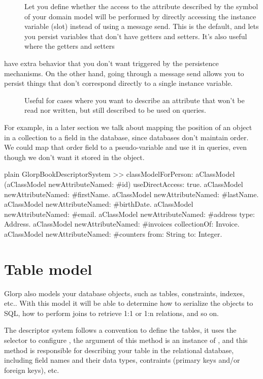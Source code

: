 \documentclass[10pt,twoside,english]{_support/latex/sbabook/sbabook}
\begin{document}
\begin{description}
\item[] Let you define whether the access to the attribute described by the symbol of your domain model will be performed by directly accessing the instance variable (slot) instead of using a message send. This is the default, and lets you persist variables that don't have getters and setters. It's also useful where the getters and setters
\end{description}

have extra behavior that you don't want triggered by the persistence mechanisms. On the other hand, going through a message send allows you to persist things that don't correspond directly to a single instance variable.

\begin{description}
\item[] Useful for cases where you want to describe an attribute that won't be read nor written, but still described to be used on queries.
\end{description}

For example, in a later section we talk about mapping the position of an object in a collection to a field in the database, since databases don't
maintain order. We could map that order field to a pseudo-variable and use it in queries, even though we don't want it stored in the object.

\begin{displaycode}{plain}
GlorpBookDescriptorSystem >> classModelForPerson: aClassModel
	(aClassModel newAttributeNamed: #id) useDirectAccess: true.
	aClassModel newAttributeNamed: #firstName.
	aClassModel newAttributeNamed: #lastName.
	aClassModel newAttributeNamed: #birthDate.
	aClassModel newAttributeNamed: #email.
	aClassModel newAttributeNamed: #address type: Address.
	aClassModel newAttributeNamed: #invoices collectionOf: Invoice.
	aClassModel newAttributeNamed: #counters from: String to: Integer.
\end{displaycode}
\section{Table model}
Glorp also models your database objects, such as tables, constraints, indexes,
etc.. With this model it will be able to determine how to serialize the objects to
SQL, how to perform joins to retrieve 1:1 or 1:n relations, and so on.

The descriptor system follows a convention to define the tables,
it uses the  selector to configure , the
argument of this method is an instance of , and this
method is responsible for describing your table in the relational
database, including field names and their data types, contraints (primary keys
and/or foreign keys), etc.
\end{document}
